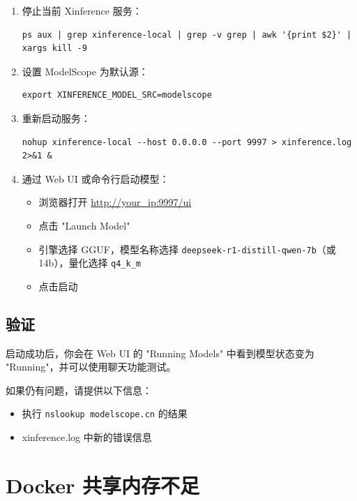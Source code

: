 \documentclass[12pt,UTF8]{ctexbook}
\begin{document}
\begin{enumerate}[leftmargin=2cm]
    \item 停止当前 Xinference 服务：
        \begin{lstlisting}
ps aux | grep xinference-local | grep -v grep | awk '{print $2}' | xargs kill -9
        \end{lstlisting}
    \item 设置 ModelScope 为默认源：
        \begin{lstlisting}
export XINFERENCE_MODEL_SRC=modelscope
        \end{lstlisting}
    \item 重新启动服务：
        \begin{lstlisting}
nohup xinference-local --host 0.0.0.0 --port 9997 > xinference.log 2>&1 &
        \end{lstlisting}
    \item 通过 Web UI 或命令行启动模型：
        \begin{itemize}[leftmargin=1cm]
            \item 浏览器打开 \url{http://your_ip:9997/ui}
            \item 点击 "Launch Model"
            \item 引擎选择 GGUF，模型名称选择 \texttt{deepseek-r1-distill-qwen-7b}（或 14b），量化选择 \texttt{q4\_k\_m}
            \item 点击启动
        \end{itemize}
\end{enumerate}

\subsection{验证}

启动成功后，你会在 Web UI 的 "Running Models" 中看到模型状态变为 "Running"，并可以使用聊天功能测试。

如果仍有问题，请提供以下信息：

\begin{itemize}[leftmargin=2cm]
    \item 执行 \texttt{nslookup modelscope.cn} 的结果
    \item xinference.log 中新的错误信息
\end{itemize}

\section{Docker 共享内存不足}
\label{sec:docker_shm}
\end{document}
